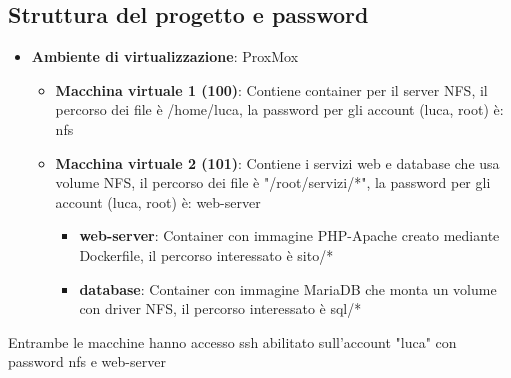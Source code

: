 \documentclass[a4paper]{article}
\begin{document}
\subsection{Struttura del progetto e password}
\begin{itemize}
    \item \textbf{Ambiente di virtualizzazione}: ProxMox
    \begin{itemize}
        \item \textbf{Macchina virtuale 1 (100)}: Contiene container per il server NFS, il percorso dei file è /home/luca, la password per gli account (luca, root) è: nfs
        \item \textbf{Macchina virtuale 2 (101)}: Contiene i servizi web e database che usa volume NFS, il percorso dei file è "/root/servizi/*", la password per gli account (luca, root) è: web-server
        \begin{itemize}
            \item \textbf{web-server}: Container con immagine PHP-Apache creato mediante Dockerfile, il percorso interessato è sito/*
            \item \textbf{database}: Container con immagine MariaDB che monta un volume con driver NFS, il percorso interessato è sql/*
        \end{itemize}
    \end{itemize}
\end{itemize}
Entrambe le macchine hanno accesso ssh abilitato sull'account "luca" con password nfs e web-server


\printglossaries
\printbibliography
\end{document}
